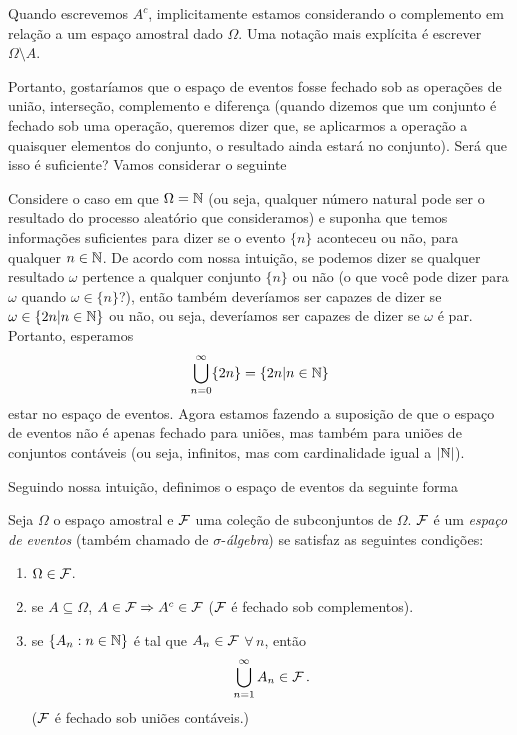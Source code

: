 \begin{notation*}
Quando escrevemos $A^c$, implicitamente estamos considerando o complemento em relação a um espaço amostral dado $ \Omega $.
Uma notação mais explícita é escrever $ \Omega \setminus A $.
\end{notation*}

Portanto, gostaríamos que o espaço de eventos fosse fechado sob as operações de união, interseção, complemento e diferença (quando dizemos que um conjunto é fechado sob uma operação, queremos dizer que, se aplicarmos a operação a quaisquer elementos do conjunto, o resultado ainda estará no conjunto). Será que isso é suficiente? Vamos considerar o seguinte
\begin{example}
Considere o caso em que $\Omega=\mathbb{N}$ (ou seja, qualquer número natural pode ser o resultado do processo aleatório que consideramos) e suponha que temos informações suficientes para dizer se o evento $\{n\}$ aconteceu ou não, para qualquer $n\in\mathbb{N}$. De acordo com nossa intuição, se podemos dizer se qualquer resultado $\omega$ pertence a qualquer conjunto $\{n\}$ ou não (o que você pode dizer para $\omega$ quando $\omega\in\{n\}$?), então também deveríamos ser capazes de dizer se $\omega\in\{2n|n\in\mathbb{N}\}$ ou não, ou seja, deveríamos ser capazes de dizer se $\omega$ é par. Portanto, esperamos
\[
\bigcup_{n=0}^\infty \{2n\} = \{2n|n\in\mathbb{N}\}
\]
estar no espaço de eventos. Agora estamos fazendo a suposição de que o espaço de eventos não é apenas fechado para uniões, mas também para uniões de conjuntos contáveis (ou seja, infinitos, mas com cardinalidade igual a $|\mathbb{N}|$).
\end{example}

Seguindo nossa intuição, definimos o espaço de eventos da seguinte forma

\begin{definition} \label{def: espaço de eventos}
Seja $\Omega$ o espaço amostral e $\mathcal F$ uma coleção de subconjuntos de $\Omega$. $\mathcal F$ é um \emph{espaço de eventos} (também chamado de $\sigma$-\emph{álgebra}) se satisfaz as seguintes condições:
\begin{enumerate}
[$ (i) $]
\item $\Omega\in\mathcal F$.
\item se $A \subseteq \Omega$, $A \in \mathcal F \Rightarrow A^c \in \mathcal F$ ($\mathcal F$ é fechado sob complementos).
\item se $\{A_n: n \in \mathbb{N}\}$ é tal que $A_n \in \mathcal F$ $\forall \, n$, então
\begin{equation}
\bigcup_{n=1}^{\infty} A_n \in \mathcal F \,.
\end{equation}
($\mathcal F$ é fechado sob uniões contáveis.)
\end{enumerate}
\end{definition}

